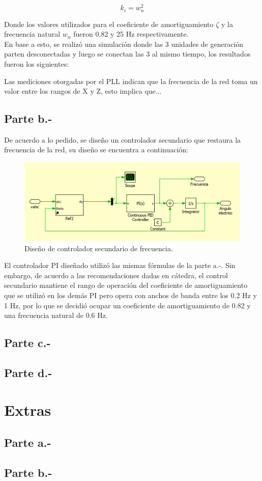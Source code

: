 \begin{equation}
    k_i = w_{n}^2
\end{equation}

Donde los valores utilizados para el coeficiente de amortiguamiento $\zeta$ y la frecuencia natural $w_{n}$ fueron 0.82 y 25 Hz respectivamente.\\

En base a esto, se realizó una simulación donde las 3 unidades de generación parten desconectadas y luego se conectan las 3 al mismo tiempo, los resultados fueron los siguientes:



Las mediciones otorgadas por el PLL indican que la frecuencia de la red toma un valor entre los rangos de X y Z, esto implica que...

\subsection{Parte b.-}

De acuerdo a lo pedido, se diseño un controlador secundario que restaura la frecuencia de la red, su diseño se encuentra a continuación:

\begin{figure}
   \centering
   \includegraphics[width=0.5\linewidth]{Tarea 1/report/imagenes/p3a/pllred.png}
   \caption{Diseño de controlador secundario de frecuencia.}
   \label{diseñosecfrecuencia}
\end{figure}

El controlador PI diseñado utilizó las mismas fórmulas de la parte a.-. Sin embargo, de acuerdo a las recomendaciones dadas en cátedra, el control secundario mantiene el rango de operación del coeficiente de amortiguamiento que se utilizó en los demás PI pero opera con anchos de banda entre los 0.2 Hz y 1 Hz, por lo que se decidió ocupar un coeficiente de amortiguamiento de 0.82 y una frecuencia natural de 0.6 Hz.



\subsection{Parte c.-}



\subsection{Parte d.-}



\section{Extras}

\subsection{Parte a.-}



\subsection{Parte b.-}



